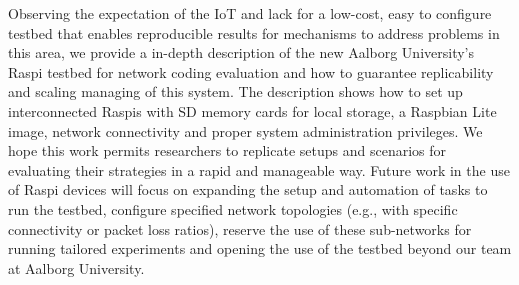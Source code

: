\label{sec:conclusions}
Observing the expectation of the \ac{IoT} and lack for a low-cost, easy to configure testbed that enables reproducible results for mechanisms to address problems in this area, we provide a in-depth description of the new Aalborg University's \ac{Raspi} testbed for network coding evaluation and how to guarantee replicability and scaling managing of this system. The description shows how to set up interconnected \ac{Raspi}s with SD memory cards for local storage, a Raspbian Lite image, network connectivity and proper system administration privileges. We hope this work permits researchers to replicate setups and scenarios for evaluating their strategies in a rapid and manageable way. Future work in the use of \ac{Raspi} devices will focus on expanding the setup and automation of tasks to run the testbed, configure specified network topologies (e.g., with specific connectivity or packet loss ratios), reserve the use of these sub-networks for running tailored experiments and opening the use of the testbed beyond our team at Aalborg University.

